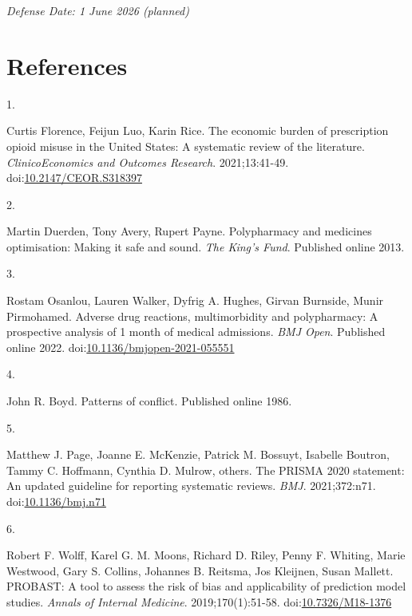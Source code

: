 \documentclass[
  12pt,
]{book}
\newlength{\cslhangindent}
\newlength{\csllabelwidth}
\newenvironment{CSLReferences}[2] %
 {\begin{list}{}{%
  \setlength{\itemindent}{0pt}
  \setlength{\leftmargin}{0pt}
  \setlength{\parsep}{0pt}
  \ifodd #1
   \setlength{\leftmargin}{\cslhangindent}
   \setlength{\itemindent}{-1\cslhangindent}
  \fi
  \setlength{\itemsep}{#2\baselineskip}}}
 {\end{list}}
\newcommand{\CSLLeftMargin}[1]{\parbox[t]{\csllabelwidth}{\strut#1\strut}}
\newcommand{\CSLRightInline}[1]{\parbox[t]{\linewidth - \csllabelwidth}{\strut#1\strut}}
\begin{document}
\emph{Defense Date: 1 June 2026 (planned)}

\cleardoublepage

\chapter*{References}\label{references}

\label{refs}
\begin{CSLReferences}{0}{1}
\CSLLeftMargin{1. }%
\CSLRightInline{Curtis Florence, Feijun Luo, Karin Rice. The economic
burden of prescription opioid misuse in the {United States}: A
systematic review of the literature. \emph{ClinicoEconomics and Outcomes
Research}. 2021;13:41-49.
doi:\href{https://doi.org/10.2147/CEOR.S318397}{10.2147/CEOR.S318397}}

\CSLLeftMargin{2. }%
\CSLRightInline{Martin Duerden, Tony Avery, Rupert Payne. Polypharmacy
and medicines optimisation: Making it safe and sound. \emph{The King's
Fund}. Published online 2013.}

\CSLLeftMargin{3. }%
\CSLRightInline{Rostam Osanlou, Lauren Walker, Dyfrig A. Hughes, Girvan
Burnside, Munir Pirmohamed. Adverse drug reactions, multimorbidity and
polypharmacy: A prospective analysis of 1 month of medical admissions.
\emph{BMJ Open}. Published online 2022.
doi:\href{https://doi.org/10.1136/bmjopen-2021-055551}{10.1136/bmjopen-2021-055551}}

\CSLLeftMargin{4. }%
\CSLRightInline{John R. Boyd. Patterns of conflict. Published online
1986.}

\CSLLeftMargin{5. }%
\CSLRightInline{Matthew J. Page, Joanne E. McKenzie, Patrick M. Bossuyt,
Isabelle Boutron, Tammy C. Hoffmann, Cynthia D. Mulrow, others. The
{PRISMA} 2020 statement: An updated guideline for reporting systematic
reviews. \emph{BMJ}. 2021;372:n71.
doi:\href{https://doi.org/10.1136/bmj.n71}{10.1136/bmj.n71}}

\CSLLeftMargin{6. }%
\CSLRightInline{Robert F. Wolff, Karel G. M. Moons, Richard D. Riley,
Penny F. Whiting, Marie Westwood, Gary S. Collins, Johannes B. Reitsma,
Jos Kleijnen, Susan Mallett. {PROBAST}: A tool to assess the risk of
bias and applicability of prediction model studies. \emph{Annals of
Internal Medicine}. 2019;170(1):51-58.
doi:\href{https://doi.org/10.7326/M18-1376}{10.7326/M18-1376}}


\end{CSLReferences}
\end{document}
